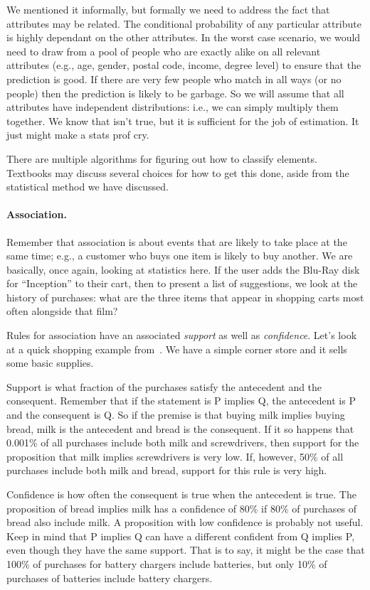 We mentioned it informally, but formally we need to address the fact that attributes may be related. The conditional probability of any particular attribute is highly dependant on the other attributes. In the worst case scenario, we would need to draw from a pool of people who are exactly alike on all relevant attributes (e.g., age, gender, postal code, income, degree level) to ensure that the prediction is good. If there are very few people who match in all ways (or no people) then the prediction is likely to be garbage.  So we will assume that all attributes have independent distributions: i.e., we can simply multiply them together. We know that isn't true, but it is sufficient for the job of estimation. It just might make a stats prof cry.

There are multiple algorithms for figuring out how to classify elements. Textbooks may discuss several choices for how to get this done, aside from the statistical method we have discussed. 



\paragraph{Association.} Remember that association is about events that are likely to take place at the same time; e.g., a customer who buys one item is likely to buy another. We are basically, once again, looking at statistics here. If the user adds the Blu-Ray disk for ``Inception'' to their cart, then to present a list of suggestions, we look at the history of purchases: what are the three items that appear in shopping carts most often alongside that film?

Rules for association have an associated \textit{support} as well as \textit{confidence}. Let's look at a quick shopping example from~\cite{dsc}. We have a simple corner store and it sells some basic supplies.

Support is what fraction of the purchases satisfy the antecedent and the consequent. Remember that if the statement is P implies Q, the antecedent is P and the consequent is Q. So if the premise is that buying milk implies buying bread, milk is the antecedent and bread is the consequent. If it so happens that 0.001\% of all purchases include both milk and screwdrivers, then support for the proposition that milk implies screwdrivers is very low. If, however, 50\% of all purchases include both milk and bread, support for this rule is very high.

Confidence is how often the consequent is true when the antecedent is true. The proposition of bread implies milk has a confidence of 80\% if 80\% of purchases of bread also include milk. A proposition with low confidence is probably not useful. Keep in mind that P implies Q can have a different confident from Q implies P, even though they have the same support. That is to say, it might be the case that 100\% of purchases for battery chargers include batteries, but only 10\% of purchases of batteries include battery chargers.

